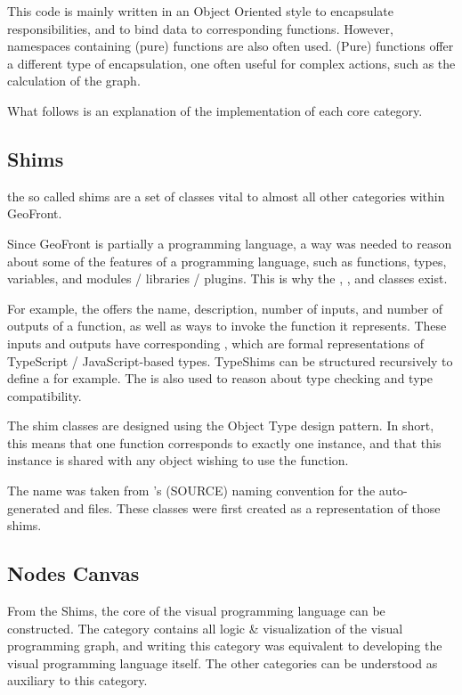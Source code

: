 This code is mainly written in an Object Oriented style to encapsulate responsibilities, and to bind data to corresponding functions. However, namespaces containing (pure) functions are also often used. (Pure) functions offer a different type of encapsulation, one often useful for complex actions, such as the calculation of the graph. 

What follows is an explanation of the implementation of each core category.

\subsection{ Shims }
the so called shims are a set of classes vital to almost all other categories within GeoFront.

Since GeoFront is partially a programming language, a way was needed to reason about some of the features of a programming language, such as functions, types, variables, and modules / libraries / plugins. 
This is why the , ,  and  classes exist. 

For example, the  offers the name, description, number of inputs, and number of outputs of a function, as well as ways to invoke the function it represents.
These inputs and outputs have corresponding , which are formal representations of TypeScript / JavaScript-based types. TypeShims can be structured recursively to define a  for example. The  is also used to reason about type checking and type compatibility.

The shim classes are designed using the Object Type design pattern. In short, this means that one function corresponds to exactly one  instance, and that this instance is shared with any object wishing to use the function. 

The name  was taken from 's (SOURCE) naming convention for the auto-generated  and  files. These classes were first created as a representation of those shims.


\subsection{ Nodes Canvas }
From the Shims, the core of the visual programming language can be constructed. The  category contains all logic \& visualization of the visual programming graph, and writing this category was equivalent to developing the visual programming language itself. The other categories can be understood as auxiliary to this category.

